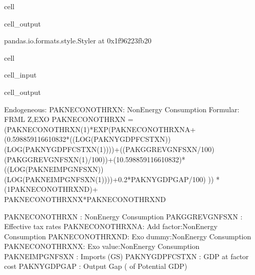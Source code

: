 \documentclass[letterpaper,10pt,english]{jupyterBook}
\begin{document}
\begin{sphinxuseclass}{cell}
\begin{sphinxVerbatimOutput}
\begin{sphinxuseclass}{cell_output}
\begin{sphinxVerbatim}[commandchars=\\\{\}]
\PYGZlt{}pandas.io.formats.style.Styler at 0x1f96223fb20\PYGZgt{}
\end{sphinxVerbatim}

\begin{sphinxVerbatim}[commandchars=\\\{\}]

\end{sphinxVerbatim}

\end{sphinxuseclass}\end{sphinxVerbatimOutput}

\end{sphinxuseclass}
\begin{sphinxuseclass}{cell}\begin{sphinxVerbatimInput}

\begin{sphinxuseclass}{cell_input}
\begin{sphinxVerbatim}[commandchars=\\\{\}]
\end{sphinxVerbatim}

\end{sphinxuseclass}\end{sphinxVerbatimInput}
\begin{sphinxVerbatimOutput}

\begin{sphinxuseclass}{cell_output}
\begin{sphinxVerbatim}[commandchars=\\\{\}]
Endogeneous: PAKNECONOTHRXN: Non\PYGZhy{}Energy Consumption
Formular: FRML \PYGZlt{}Z,EXO\PYGZgt{} PAKNECONOTHRXN = (PAKNECONOTHRXN(\PYGZhy{}1)*EXP(\PYGZhy{}PAKNECONOTHRXN\PYGZus{}A+ (0.598859116610832*((LOG(PAKNYGDPFCSTXN))\PYGZhy{}(LOG(PAKNYGDPFCSTXN(\PYGZhy{}1))))+((PAKGGREVGNFSXN/100)\PYGZhy{}(PAKGGREVGNFSXN(\PYGZhy{}1)/100))+(1\PYGZhy{}0.598859116610832)*((LOG(PAKNEIMPGNFSXN))\PYGZhy{}(LOG(PAKNEIMPGNFSXN(\PYGZhy{}1))))+0.2*PAKNYGDPGAP\PYGZus{}/100) )) * (1\PYGZhy{}PAKNECONOTHRXN\PYGZus{}D)+ PAKNECONOTHRXN\PYGZus{}X*PAKNECONOTHRXN\PYGZus{}D  \PYGZdl{}

PAKNECONOTHRXN  : Non\PYGZhy{}Energy Consumption
PAKGGREVGNFSXN  : Effective tax rates
PAKNECONOTHRXN\PYGZus{}A: Add factor:Non\PYGZhy{}Energy Consumption
PAKNECONOTHRXN\PYGZus{}D: Exo dummy:Non\PYGZhy{}Energy Consumption
PAKNECONOTHRXN\PYGZus{}X: Exo value:Non\PYGZhy{}Energy Consumption
PAKNEIMPGNFSXN  : Imports (G\PYGZam{}S)
PAKNYGDPFCSTXN  : GDP at factor cost
PAKNYGDPGAP\PYGZus{}    : Output Gap (\PYGZpc{} of Potential GDP)
\end{sphinxVerbatim}

\end{sphinxuseclass}\end{sphinxVerbatimOutput}

\end{sphinxuseclass}
\end{document}
